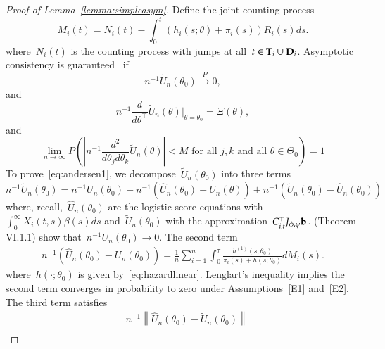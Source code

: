 \documentclass[12pt]{amsart}
\def\bfT{{\bf T}}
\def\bfD{{\bf D}}
\begin{document}
\begin{proof}[Proof of Lemma~\ref{lemma:simpleasym}]
Define the joint counting process
\[
M_i (t) = N_i (t) - \int_0^t (h_i (s; \theta) + \pi_i (s)) R_i (s) ds.
\]
where~$N_i (t)$ is the counting process with jumps at all~$t \in \bfT_i \cup \bfD_i$. Asymptotic consistency is guaranteed~\cite[Theorem VI.1.1]{Andersen1993} if
\begin{equation}
\label{eq:andersen1}
n^{-1} \tilde U_n (\theta_0 ) \overset{P}{\to} 0,
\end{equation}
and
\begin{equation}
\label{eq:andersen2}
n^{-1} \frac{d}{d \theta^{\top}} \tilde U_n (\theta) \big |_{\theta =
  \theta_0} = \Xi (\theta),
\end{equation}
and
\begin{equation}
\label{eq:andersen3}
\lim_{n \to \infty} P \left( \left | n^{-1} \frac{d^2}{d \theta_j d
      \theta_k} \tilde U_n (\theta) \right | < M \text{ for all }
  j,k \text{ and all } \theta \in \Theta_0 \right) = 1
\end{equation}
To prove~\eqref{eq:andersen1}, we decompose~$\tilde U_n (\theta_0)$ into
three terms
\begin{equation}
\label{eq:decomp}
n^{-1} \tilde U_n (\theta_0) = n^{-1} U_n (\theta_0 )  + n^{-1} \left(
  \hat U_n (\theta_0) - U_n (\theta) \right) + n^{-1} \left(\tilde U_n
  (\theta_0) - \hat U_n (\theta_0) \right)
\end{equation}
where, recall,~$\hat U_n (\theta_0)$ are the logistic score equations with $\int_0^\infty X_i(t,s) \beta(s) ds$ and~$\tilde U_n (\theta_0)$ with the approximation~$C_{i,t}^\top J_{\phi, \psi} {\bf b}$. \cite{Andersen1993} (Theorem VI.1.1) show that~$n^{-1} U_n (\theta_0)
\to 0$. The second term
\begin{align*}
n^{-1} \left( \hat U_n (\theta_0) - U_n (\theta_0) \right) =
  \frac{1}{n} \sum_{i=1}^n \int_0^{\tau} \frac{h^{(1)} (s;
  \theta_0)}{\pi_i (s) + h (s;\theta_0)} d M_i (s).
\end{align*}
where~$h(\cdot; \theta_0)$ is given by~\eqref{eq:hazardlinear}. Lenglart's inequality implies the second term converges in probability to zero under Assumptions~\ref{E1} and~\ref{E2}. The third term satisfies
\begin{align*}
  &n^{-1} \left \| \hat U_n (\theta_0) - \tilde U_n (\theta_0) \right \| \\

\end{align*}
\end{proof}
\end{document}
